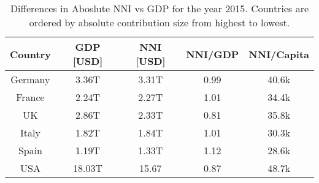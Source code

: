 \begin{center}
\begin{table}[]
\begin{center}
\caption{Differences in Aboslute NNI vs GDP for the year 2015. Countries are ordered by absolute 
contribution size from highest to lowest.}
\begin{tabular}{ccccc}
\textbf{Country} & \textbf{GDP [USD]} & \textbf{NNI [USD]} &  \textbf{NNI/GDP} & \textbf{NNI/Capita}    \\
\hline
Germany & 3.36T & 3.31T & 0.99 & 40.6k\\
France  & 2.24T & 2.27T & 1.01 & 34.4k\\
UK      & 2.86T & 2.33T & 0.81 & 35.8k\\
Italy   & 1.82T & 1.84T & 1.01 & 30.3k\\
Spain   & 1.19T & 1.33T & 1.12 & 28.6k\\
\hline
USA     & 18.03T & 15.67 & 0.87 & 48.7k\\
\end{tabular}
\end{center}
\label{tab:nnicontrib}
\end{table}
\end{center}
